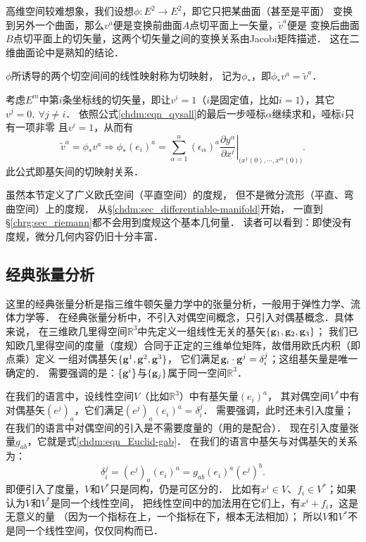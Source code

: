 高维空间较难想象，我们设想$\phi:E^2\to E^2$，即它只把某曲面（甚至是平面）
变换到另外一个曲面，那么$v^a$便是变换前曲面$A$点切平面上一矢量，$\tilde{v}^a$便是
变换后曲面$B$点切平面上的切矢量，这两个切矢量之间的变换关系由Jacobi矩阵描述．
这在二维曲面论中是熟知的结论． %

$\phi$所诱导的两个切空间间的线性映射称为{\heiti 切映射}，
记为$\phi_*$，即$\phi_* v^a = \tilde{v}^a$．

考虑$E^m$中第$i$条坐标线的切矢量，即让$v^i=1$（$i$是固定值，比如$i=1$），其它$v^j=0,\ \forall j\neq i$．
依照公式\eqref{chdm:eqn_qysall}的最后一步哑标$\alpha$继续求和，哑标$i$只有一项非零
且$v^i=1$，从而有
\begin{equation}
    \tilde{v}^a = \phi_* v^a \Rightarrow \phi_* (e_i)^a = \sum_{\alpha =1}^{n} (\epsilon_\alpha)^a  
     \left.\frac{\partial y^\alpha}{\partial x^i} \right|_{\bigl(x^1(0),\cdots,x^m(0)\bigr)} .
\end{equation}
此公式即基矢间的切映射关系．


虽然本节定义了广义欧氏空间（平直空间）的度规，
但不是微分流形（平直、弯曲空间）上的度规．
从\S\ref{chdm:sec_differentiable-manifold}开始，
一直到\S\ref{chrg:sec_riemann}都不会用到度规这个基本几何量．
读者可以看到：即使没有度规，微分几何内容仍旧十分丰富．

\subsection{经典张量分析}\label{chdm:sec_classical-tensor}

这里的{\kaishu 经典张量分析}是指三维牛顿矢量力学中的张量分析，一般用于弹性力学、流体力学等．
在经典张量分析中，不引入对偶空间概念，只引入对偶基概念．具体来说，
在三维欧几里得空间$\mathbb{R}^3$中先定义一组线性无关的基矢$\{{\bf g}_1, {\bf g}_2, {\bf g}_3\}$；
我们已知欧几里得空间的度量（度规）合同于正定的三维单位矩阵，故借用欧氏内积（即点乘）定义
一组对偶基矢$\{{\bf g}^1, {\bf g}^2, {\bf g}^3\}$，
它们满足${\bf g}_i \cdot {\bf g}^j =\delta _i^j$；这组基矢量是唯一确定的．
需要强调的是：{\kaishu $\{{\bf g}^i\}$与$\{{\bf g}_j\}$属于同一空间$\mathbb{R}^3$．}

在我们的语言中，设线性空间$V$（比如$\mathbb{R}^3$）中有基矢量$(e_i)^a$，
其对偶空间$V^*$中有对偶基矢$(e^j)_a$，它们满足$(e^j)_a (e_i)^a =\delta_i^j$．
需要强调，此时还未引入度量；在我们的语言中对偶空间的引入是不需要度量的（用的是{\kaishu 配合}）．
现在引入度量张量$g_{ab}$，它就是式\eqref{chdm:eqn_Euclid-gab}．
在我们的语言中基矢与对偶基矢的关系为：
\begin{equation}\label{chdm:tmp-Bedual}
    \delta_i^j =(e^j)_a (e_i)^a = g_{ab} (e_i)^a (e^j)^b  .
\end{equation}
即便引入了度量，$V$和$V^*$只是同构，仍是可区分的．
比如有$x^i \in V$、$f_i\in V^*$；如果认为$V$和$V^*$是同一个线性空间，
把线性空间中的{\kaishu 加法}用在它们上，有$x^i+f_i$，这是无意义的量
（因为一个指标在上，一个指标在下，根本无法相加）；
所以$V$和$V^*$不是同一个线性空间，仅仅同构而已．

